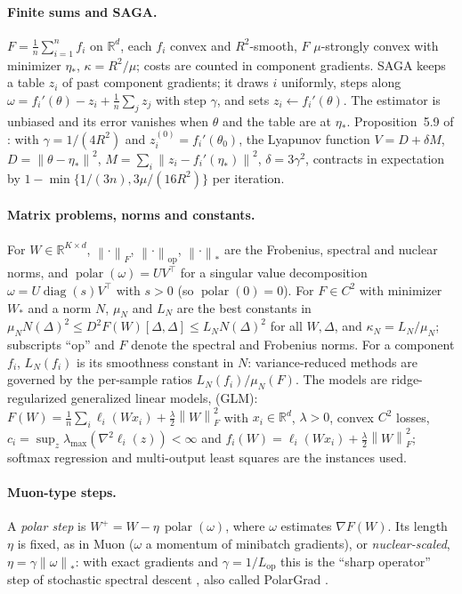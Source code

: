 \documentclass[10pt]{article}
\theoremstyle{remark}
\newcommand{\R}{\mathbb{R}}
\newcommand{\norm}[1]{\left\|#1\right\|}
\newcommand{\nop}[1]{\left\|#1\right\|_{\mathrm{op}}}
\newcommand{\nnuc}[1]{\left\|#1\right\|_{*}}
\newcommand{\nF}[1]{\left\|#1\right\|_{F}}
\newcommand{\diag}{\operatorname{diag}}
\newcommand{\polar}{\operatorname{polar}}
\newcommand{\Lop}{L_{\mathrm{op}}}
\newcommand{\lmax}{\lambda_{\max}}
\newcommand{\etas}{\eta_\ast}
\begin{document}
\paragraph{Finite sums and SAGA.} $F=\frac1n\sum_{i=1}^nf_i$ on $\R^d$, each $f_i$ convex and $R^2$-smooth, $F$
$\mu$-strongly convex with minimizer $\etas$, $\kappa=R^2/\mu$; costs are counted in component gradients. SAGA keeps a
table $z_i$ of past component gradients; it draws $i$ uniformly, steps along
$\omega=f_i'(\theta)-z_i+\frac1n\sum_jz_j$ with step $\gamma$, and sets $z_i\leftarrow f_i'(\theta)$. The estimator is
unbiased and its error vanishes when $\theta$ and the table are at $\etas$. Proposition~5.9 of \cite{bach2024learning}:
with $\gamma=1/(4R^2)$ and $z_i^{(0)}=f_i'(\theta_0)$, the Lyapunov function
$V=D+\delta M$, $D=\norm{\theta-\etas}^2$, $M=\sum_i\norm{z_i-f_i'(\etas)}^2$, $\delta=3\gamma^2$, contracts in
expectation by $1-\min\{1/(3n),3\mu/(16R^2)\}$ per iteration.

\paragraph{Matrix problems, norms and constants.} For $W\in\R^{K\times d}$, $\nF\cdot$, $\nop\cdot$, $\nnuc\cdot$ are
the Frobenius, spectral and nuclear norms, and $\polar(\omega)=UV^\top$ for a singular value decomposition
$\omega=U\diag(s)V^\top$ with $s>0$ (so $\polar(0)=0$). For $F\in C^2$ with minimizer $W_\ast$ and a norm $N$, $\mu_N$
and $L_N$ are the best constants in $\mu_NN(\Delta)^2\le D^2F(W)[\Delta,\Delta]\le L_NN(\Delta)^2$ for all $W,\Delta$,
and $\kappa_N=L_N/\mu_N$; subscripts ``op'' and $F$ denote the spectral and Frobenius norms. For a component $f_i$,
$L_N(f_i)$ is its smoothness constant in $N$: variance-reduced methods are governed by the per-sample ratios
$L_N(f_i)/\mu_N(F)$. The models are ridge-regularized generalized linear models, (GLM):
$F(W)=\frac1n\sum_i\ell_i(Wx_i)+\frac\lambda2\nF W^2$ with $x_i\in\R^d$, $\lambda>0$, convex $C^2$ losses,
$c_i=\sup_z\lmax(\nabla^2\ell_i(z))<\infty$ and $f_i(W)=\ell_i(Wx_i)+\frac\lambda2\nF W^2$; softmax regression and
multi-output least squares are the instances used.

\paragraph{Muon-type steps.} A \emph{polar step} is $W^+=W-\eta\,\polar(\omega)$, where $\omega$ estimates $\nabla
F(W)$. Its length $\eta$ is fixed, as in Muon ($\omega$ a momentum of minibatch gradients), or
\emph{nuclear-scaled}, $\eta=\gamma\nnuc\omega$: with exact gradients and $\gamma=1/\Lop$ this is the ``sharp operator''
step of stochastic spectral descent \cite{carlson2015stochastic}, also called PolarGrad \cite{lau2025polargrad}.
\end{document}
